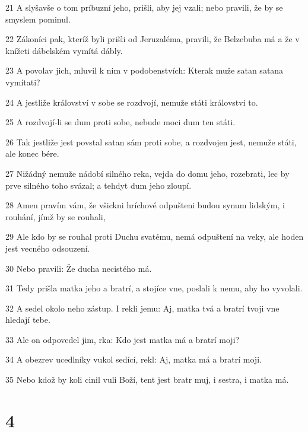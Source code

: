 \par 21 A slyšavše o tom príbuzní jeho, prišli, aby jej vzali; nebo pravili, že by se smyslem pominul.
\par 22 Zákoníci pak, kteríž byli prišli od Jeruzaléma, pravili, že Belzebuba má a že v knížeti dábelském vymítá dábly.
\par 23 A povolav jich, mluvil k nim v podobenstvích: Kterak muže satan satana vymítati?
\par 24 A jestliže království v sobe se rozdvojí, nemuže státi království to.
\par 25 A rozdvojí-li se dum proti sobe, nebude moci dum ten státi.
\par 26 Tak jestliže jest povstal satan sám proti sobe, a rozdvojen jest, nemuže státi, ale konec bére.
\par 27 Nižádný nemuže nádobí silného reka, vejda do domu jeho, rozebrati, lec by prve silného toho svázal; a tehdyt dum jeho zloupí.
\par 28 Amen pravím vám, že všickni hríchové odpušteni budou synum lidským, i rouhání, jímž by se rouhali,
\par 29 Ale kdo by se rouhal proti Duchu svatému, nemá odpuštení na veky, ale hoden jest vecného odsouzení.
\par 30 Nebo pravili: Že ducha necistého má.
\par 31 Tedy prišla matka jeho a bratrí, a stojíce vne, poslali k nemu, aby ho vyvolali.
\par 32 A sedel okolo neho zástup. I rekli jemu: Aj, matka tvá a bratrí tvoji vne hledají tebe.
\par 33 Ale on odpovedel jim, rka: Kdo jest matka má a bratrí moji?
\par 34 A obezrev ucedlníky vukol sedící, rekl: Aj, matka má a bratrí moji.
\par 35 Nebo kdož by koli cinil vuli Boží, tent jest bratr muj, i sestra, i matka má.

\chapter{4}

